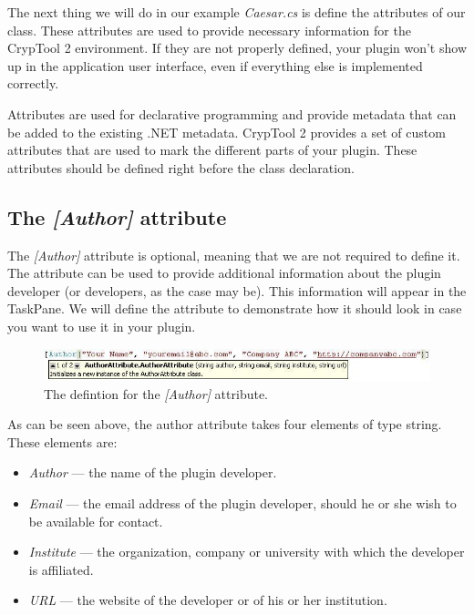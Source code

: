 The next thing we will do in our example \textit{Caesar.cs} is define the attributes of our class. These attributes are used to provide necessary information for the CrypTool 2 environment. If they are not properly defined, your plugin won't show up in the application user interface, even if everything else is implemented correctly.

Attributes are used for declarative programming and provide metadata that can be added to the existing .NET metadata. CrypTool 2 provides a set of custom attributes that are used to mark the different parts of your plugin. These attributes should be defined right before the class declaration.
\clearpage

\subsection{The \protect\textit{[Author]} attribute}
\label{sec:TheAuthorAttribute}

The \textit{[Author]} attribute is optional, meaning that we are not required to define it. The attribute can be used to provide additional information about the plugin developer (or developers, as the case may be). This information will appear in the TaskPane. We will define the attribute to demonstrate how it should look in case you want to use it in your plugin.

\begin{figure}[h!]
	\centering
		\includegraphics[width=.90\textwidth]{figures/attribute_author.jpg}
	\caption{The defintion for the \textit{[Author]} attribute.}
	\label{fig:attribute_author}
\end{figure}

As can be seen above, the author attribute takes four elements of type string. These elements are:

\begin{itemize}
	\item \textit{Author} --- the name of the plugin developer.
	\item \textit{Email} --- the email address of the plugin developer, should he or she wish to be available for contact.
	\item \textit{Institute} --- the organization, company or university with which the developer is affiliated.
	\item \textit{URL} --- the website of the developer or of his or her institution.
\end{itemize}


